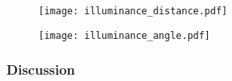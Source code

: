 \begin{figure}[ht]
	\centering
	\texttt{[image: illuminance\_distance.pdf]}
	\caption{}
	\label{fig:illuminance_distance}
\end{figure}

\begin{figure}[ht]
	\centering
	\texttt{[image: illuminance\_angle.pdf]}
	\caption{}
	\label{fig:illuminance_angle}
\end{figure}

\subsubsection{Discussion}